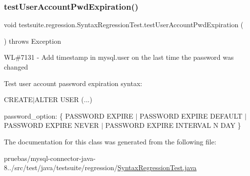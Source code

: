 \subsubsection{\texorpdfstring{test\+User\+Account\+Pwd\+Expiration()}{testUserAccountPwdExpiration()}}
{\footnotesize\ttfamily void testsuite.\+regression.\+Syntax\+Regression\+Test.\+test\+User\+Account\+Pwd\+Expiration (\begin{DoxyParamCaption}{ }\end{DoxyParamCaption}) throws Exception}

WL\#7131 -\/ Add timestamp in mysql.\+user on the last time the password was changed

Test user account password expiration syntax\+:

C\+R\+E\+A\+T\+E$\vert$\+A\+L\+T\+ER U\+S\+ER (...)
\begin{DoxyItemize}
\item password\+\_\+option\+: \{ P\+A\+S\+S\+W\+O\+RD E\+X\+P\+I\+RE $\vert$ P\+A\+S\+S\+W\+O\+RD E\+X\+P\+I\+RE D\+E\+F\+A\+U\+LT $\vert$ P\+A\+S\+S\+W\+O\+RD E\+X\+P\+I\+RE N\+E\+V\+ER $\vert$ P\+A\+S\+S\+W\+O\+RD E\+X\+P\+I\+RE I\+N\+T\+E\+R\+V\+AL N D\+AY \} 
\end{DoxyItemize}

The documentation for this class was generated from the following file\+:\begin{DoxyCompactItemize}
\item 
pruebas/mysql-\/connector-\/java-\/8../src/test/java/testsuite/regression/\mbox{\hyperlink{_syntax_regression_test_8java}{Syntax\+Regression\+Test.\+java}}\end{DoxyCompactItemize}
